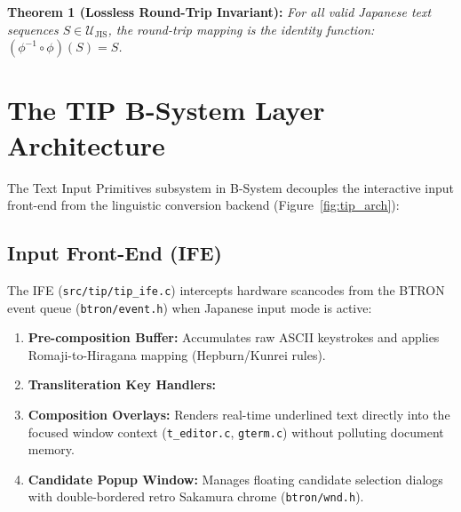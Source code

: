 \documentclass[10pt,journal,compsoc,twocolumn]{article}
\newcommand{\ja}[1]{\begin{CJK*}{UTF8}{min}#1\end{CJK*}}
\begin{document}
\noindent\textbf{Theorem 1 (Lossless Round-Trip Invariant):} \emph{For all valid Japanese text sequences $S \in \mathcal{U}_{\text{JIS}}$, the round-trip mapping is the identity function: $(\phi^{-1} \circ \phi)(S) = S$.}

\section{The TIP B-System Layer Architecture}
\label{sec:tip_layer}

The Text Input Primitives subsystem in B-System decouples the interactive input front-end from the linguistic conversion backend (Figure~\ref{fig:tip_arch}):

\subsection{Input Front-End (IFE)}
The IFE (\texttt{src/tip/tip\_ife.c}) intercepts hardware scancodes from the BTRON event queue (\texttt{btron/event.h}) when Japanese input mode is active:
\begin{enumerate}[leftmargin=*]
    \item \textbf{Pre-composition Buffer:} Accumulates raw ASCII keystrokes and applies Romaji-to-Hiragana mapping (Hepburn/Kunrei rules).
    \item \textbf{Transliteration Key Handlers:}
    \item \textbf{Composition Overlays:} Renders real-time underlined text directly into the focused window context (\texttt{t\_editor.c}, \texttt{gterm.c}) without polluting document memory.
    \item \textbf{Candidate Popup Window:} Manages floating candidate selection dialogs with double-bordered retro Sakamura chrome (\texttt{btron/wnd.h}).
\end{enumerate}
\end{document}
